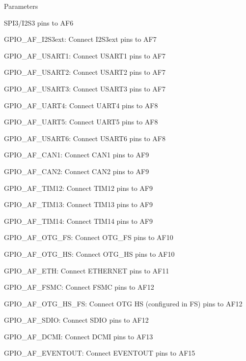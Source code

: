 \begin{DoxyParams}{Parameters}
\begin{DoxyItemize}
S\-P\-I3/\-I2\-S3 pins to A\-F6 \item G\-P\-I\-O\-\_\-\-A\-F\-\_\-\-I2\-S3ext\-: Connect I2\-S3ext pins to A\-F7 \item G\-P\-I\-O\-\_\-\-A\-F\-\_\-\-U\-S\-A\-R\-T1\-: Connect U\-S\-A\-R\-T1 pins to A\-F7 \item G\-P\-I\-O\-\_\-\-A\-F\-\_\-\-U\-S\-A\-R\-T2\-: Connect U\-S\-A\-R\-T2 pins to A\-F7 \item G\-P\-I\-O\-\_\-\-A\-F\-\_\-\-U\-S\-A\-R\-T3\-: Connect U\-S\-A\-R\-T3 pins to A\-F7 \item G\-P\-I\-O\-\_\-\-A\-F\-\_\-\-U\-A\-R\-T4\-: Connect U\-A\-R\-T4 pins to A\-F8 \item G\-P\-I\-O\-\_\-\-A\-F\-\_\-\-U\-A\-R\-T5\-: Connect U\-A\-R\-T5 pins to A\-F8 \item G\-P\-I\-O\-\_\-\-A\-F\-\_\-\-U\-S\-A\-R\-T6\-: Connect U\-S\-A\-R\-T6 pins to A\-F8 \item G\-P\-I\-O\-\_\-\-A\-F\-\_\-\-C\-A\-N1\-: Connect C\-A\-N1 pins to A\-F9 \item G\-P\-I\-O\-\_\-\-A\-F\-\_\-\-C\-A\-N2\-: Connect C\-A\-N2 pins to A\-F9 \item G\-P\-I\-O\-\_\-\-A\-F\-\_\-\-T\-I\-M12\-: Connect T\-I\-M12 pins to A\-F9 \item G\-P\-I\-O\-\_\-\-A\-F\-\_\-\-T\-I\-M13\-: Connect T\-I\-M13 pins to A\-F9 \item G\-P\-I\-O\-\_\-\-A\-F\-\_\-\-T\-I\-M14\-: Connect T\-I\-M14 pins to A\-F9 \item G\-P\-I\-O\-\_\-\-A\-F\-\_\-\-O\-T\-G\-\_\-\-F\-S\-: Connect O\-T\-G\-\_\-\-F\-S pins to A\-F10 \item G\-P\-I\-O\-\_\-\-A\-F\-\_\-\-O\-T\-G\-\_\-\-H\-S\-: Connect O\-T\-G\-\_\-\-H\-S pins to A\-F10 \item G\-P\-I\-O\-\_\-\-A\-F\-\_\-\-E\-T\-H\-: Connect E\-T\-H\-E\-R\-N\-E\-T pins to A\-F11 \item G\-P\-I\-O\-\_\-\-A\-F\-\_\-\-F\-S\-M\-C\-: Connect F\-S\-M\-C pins to A\-F12 \item G\-P\-I\-O\-\_\-\-A\-F\-\_\-\-O\-T\-G\-\_\-\-H\-S\-\_\-\-F\-S\-: Connect O\-T\-G H\-S (configured in F\-S) pins to A\-F12 \item G\-P\-I\-O\-\_\-\-A\-F\-\_\-\-S\-D\-I\-O\-: Connect S\-D\-I\-O pins to A\-F12 \item G\-P\-I\-O\-\_\-\-A\-F\-\_\-\-D\-C\-M\-I\-: Connect D\-C\-M\-I pins to A\-F13 \item G\-P\-I\-O\-\_\-\-A\-F\-\_\-\-E\-V\-E\-N\-T\-O\-U\-T\-: Connect E\-V\-E\-N\-T\-O\-U\-T pins to A\-F15 \end{DoxyItemize}
\\
\hline
\end{DoxyParams}

